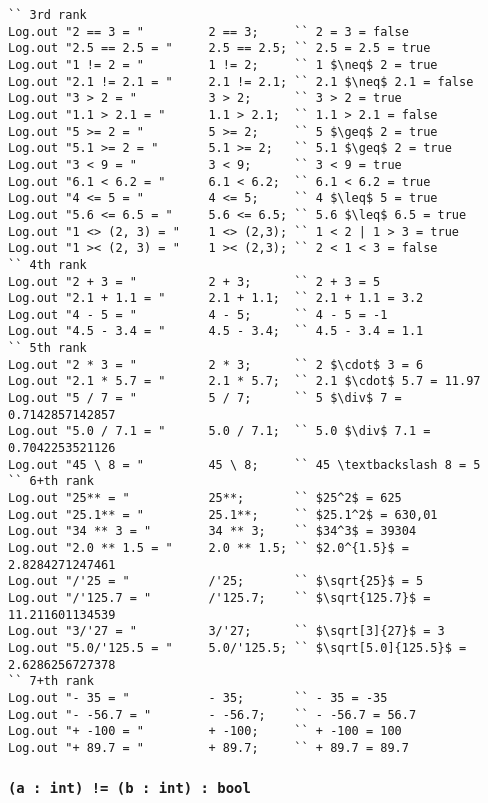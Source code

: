 \begin{sourcecode}
\label{numberopex}
\begin{verbatim}
`` 3rd rank
Log.out "2 == 3 = "			2 == 3;		`` 2 = 3 = false
Log.out "2.5 == 2.5 = "		2.5 == 2.5;	`` 2.5 = 2.5 = true
Log.out "1 != 2 = "			1 != 2;		`` 1 $\neq$ 2 = true
Log.out "2.1 != 2.1 = "		2.1 != 2.1;	`` 2.1 $\neq$ 2.1 = false
Log.out "3 > 2 = "			3 > 2;		`` 3 > 2 = true
Log.out "1.1 > 2.1 = "		1.1 > 2.1;	`` 1.1 > 2.1 = false
Log.out "5 >= 2 = "			5 >= 2;		`` 5 $\geq$ 2 = true
Log.out "5.1 >= 2 = "		5.1 >= 2;	`` 5.1 $\geq$ 2 = true
Log.out "3 < 9 = "			3 < 9;		`` 3 < 9 = true
Log.out "6.1 < 6.2 = "		6.1 < 6.2;	`` 6.1 < 6.2 = true
Log.out "4 <= 5 = "			4 <= 5;		`` 4 $\leq$ 5 = true
Log.out "5.6 <= 6.5 = "		5.6 <= 6.5;	`` 5.6 $\leq$ 6.5 = true
Log.out "1 <> (2, 3) = "	1 <> (2,3); `` 1 < 2 | 1 > 3 = true
Log.out "1 >< (2, 3) = "	1 >< (2,3); `` 2 < 1 < 3 = false
`` 4th rank
Log.out "2 + 3 = "			2 + 3;		`` 2 + 3 = 5
Log.out "2.1 + 1.1 = "		2.1 + 1.1;	`` 2.1 + 1.1 = 3.2
Log.out "4 - 5 = "			4 - 5;		`` 4 - 5 = -1
Log.out "4.5 - 3.4 = "		4.5 - 3.4;	`` 4.5 - 3.4 = 1.1
`` 5th rank
Log.out "2 * 3 = "			2 * 3;		`` 2 $\cdot$ 3 = 6
Log.out "2.1 * 5.7 = "		2.1 * 5.7;	`` 2.1 $\cdot$ 5.7 = 11.97
Log.out "5 / 7 = "			5 / 7;		`` 5 $\div$ 7 = 0.7142857142857
Log.out "5.0 / 7.1 = "		5.0 / 7.1;	`` 5.0 $\div$ 7.1 = 0.7042253521126
Log.out "45 \ 8 = "			45 \ 8;		`` 45 \textbackslash 8 = 5
`` 6+th rank
Log.out "25** = "			25**;		`` $25^2$ = 625
Log.out "25.1** = "			25.1**;		`` $25.1^2$ = 630,01
Log.out "34 ** 3 = "		34 ** 3;	`` $34^3$ = 39304
Log.out "2.0 ** 1.5 = "		2.0 ** 1.5;	`` $2.0^{1.5}$ = 2.8284271247461
Log.out "/'25 = "			/'25;		`` $\sqrt{25}$ = 5
Log.out "/'125.7 = "		/'125.7;	`` $\sqrt{125.7}$ = 11.211601134539
Log.out "3/'27 = "			3/'27;		`` $\sqrt[3]{27}$ = 3
Log.out "5.0/'125.5 = "		5.0/'125.5;	`` $\sqrt[5.0]{125.5}$ = 2.6286256727378
`` 7+th rank
Log.out "- 35 = "			- 35;		`` - 35 = -35
Log.out "- -56.7 = "		- -56.7;	`` - -56.7 = 56.7
Log.out "+ -100 = "			+ -100;		`` + -100 = 100
Log.out "+ 89.7 = "			+ 89.7;		`` + 89.7 = 89.7
\end{verbatim}
\end{sourcecode}

\subsubsection{\texttt{(a : int) != (b : int) : bool}}

